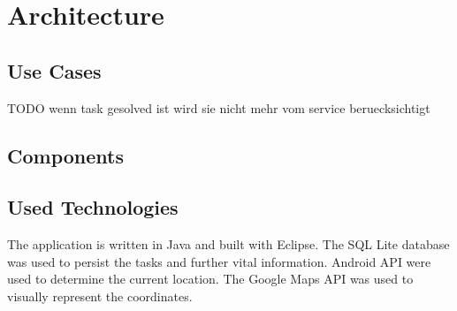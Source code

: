\section{Architecture}
\subsection{Use Cases}
TODO wenn task gesolved ist wird sie nicht mehr vom service beruecksichtigt
\subsection{Components}
\subsection{Used Technologies}
The application is written in Java and built with Eclipse. The SQL Lite database
was used to persist the tasks and further vital information. Android API were
used to determine the current location. The Google Maps API was used to visually
represent the coordinates.